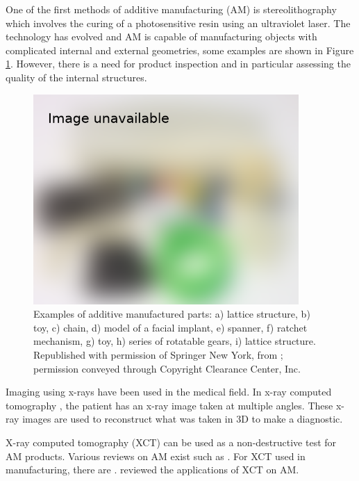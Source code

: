 One of the first methods of additive manufacturing (AM) is stereolithography \citep{kodama1981automatic, hull1986apparatus, 3d2019our} which involves the curing of a photosensitive resin using an ultraviolet laser. The technology has evolved and AM is capable of manufacturing objects with complicated internal and external geometries, some examples are shown in Figure \ref{fig:literature_3dprint}. However, there is a need for product inspection and in particular assessing the quality of the internal structures.

\begin{figure}
  \centering
  \includegraphics[width=0.9\textwidth]{../figures/literatureReview/literature_3dprint.png}
  \caption{Examples of additive manufactured parts: a) lattice structure, b) toy, c) chain, d) model of a facial implant, e) spanner, f) ratchet mechanism, g) toy, h) series of rotatable gears, i) lattice structure. Republished with permission of Springer New York, from \cite{gibson2010additive}; permission conveyed through Copyright
Clearance Center, Inc.}
  \label{fig:literature_3dprint}
\end{figure}

Imaging using x-rays \citep{rontgen1896on} have been used in the medical field. In x-ray computed tomography \citep{cormack1973reconstruction, hounsfield1973computerized, hounsfield1980computed}, the patient has an x-ray image taken at multiple angles. These x-ray images are used to reconstruct what was taken in 3D to make a diagnostic.

X-ray computed tomography (XCT) can be used as a non-destructive test for AM products. Various reviews on AM exist such as \cite{kruth1991material, kruth1998progress, pham1998comparison, gibson2010additive, wong2012review, ngo2018additive}. For XCT used in manufacturing, there are \cite{cantatore2011introduction, kruth2011computed, sun2012overview}. \cite{thompson2016x} reviewed the applications of XCT on AM.

